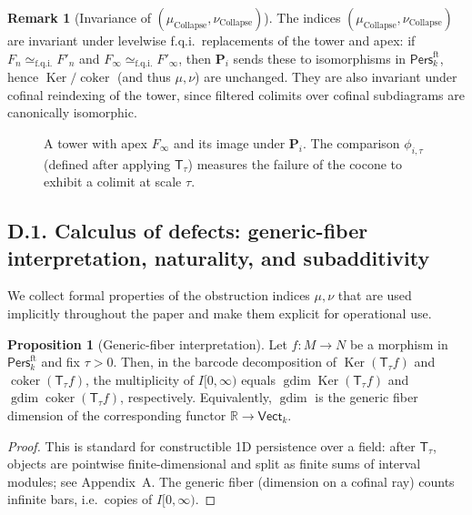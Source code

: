 \documentclass[11pt]{article}
\numberwithin{equation}{section}
\theoremstyle{plain}
\theoremstyle{definition}
\theoremstyle{remark}
\DeclareMathOperator{\Ker}{Ker}
\DeclareMathOperator{\gdim}{gdim}
\newcommand{\RR}{\mathbb{R}}
\newcommand{\Pers}{\mathsf{Pers}}
\newcommand{\Vect}{\mathsf{Vect}}
\newcommand{\T}{\mathsf{T}}
\theoremstyle{plain}
\theoremstyle{definition}
\numberwithin{equation}{section}
\newtheorem{proposition}[theorem]{Proposition}
\theoremstyle{definition}
\newtheorem{remark}[theorem]{Remark}
\DeclareRobustCommand{\muc}{\mu_{\mathrm{Collapse}}}
\DeclareRobustCommand{\nuc}{\nu_{\mathrm{Collapse}}}
\numberwithin{equation}{section}
\theoremstyle{plain}
\theoremstyle{definition}
\theoremstyle{remark}
\newcommand{\Pfun}{\mathbf{P}}
\DeclareMathOperator{\coker}{coker} %
\providecommand{\muc}{\mu_{\mathrm{Collapse}}}
\providecommand{\nuc}{\nu_{\mathrm{Collapse}}}
\providecommand{\n}{\unskip\space}
\begin{document}
\begin{remark}[Invariance of \((\muc,\nuc)\)]
The indices \((\muc,\nuc)\) are invariant under levelwise f.q.i.\ replacements of the tower and apex: if \(F_n\simeq_{\mathrm{f.q.i.}}F'_n\) and \(F_\infty\simeq_{\mathrm{f.q.i.}}F'_\infty\), then \(\Pfun_i\) sends these to isomorphisms in \(\Pers^{\mathrm{ft}}_k\), hence \(\Ker/\coker\) (and thus \(\mu,\nu\)) are unchanged.
They are also invariant under cofinal reindexing of the tower, since filtered colimits over cofinal subdiagrams are canonically isomorphic.
\end{remark}

\begin{figure}[t]
\centering
{}
\caption{A tower with apex \(F_\infty\) and its image under \(\Pfun_i\).
The comparison \(\phi_{i,\tau}\) (defined after applying \(\T_\tau\)) measures the failure of the cocone to exhibit a colimit at scale \(\tau\).}
\end{figure}

\subsection*{D.1. Calculus of defects: generic-fiber interpretation, naturality, and subadditivity}

We collect formal properties of the obstruction indices \(\mu,\nu\) that are used implicitly throughout the paper and make them explicit for operational use.

\begin{proposition}[Generic-fiber interpretation]\label{prop:D-gdim-iff}
Let \(f:M\to N\) be a morphism in \(\Pers^{\mathrm{ft}}_k\) and fix \(\tau>0\).
Then, in the barcode decomposition of \(\Ker(\T_\tau f)\) and \(\coker(\T_\tau f)\), the multiplicity of \(I[0,\infty)\) equals \(\gdim\Ker(\T_\tau f)\) and \(\gdim\coker(\T_\tau f)\), respectively.
Equivalently, \(\gdim\) is the generic fiber dimension of the corresponding functor \(\RR\to\Vect_k\).
\end{proposition}

\begin{proof}
This is standard for constructible 1D persistence over a field: after \(\T_\tau\), objects are pointwise finite-dimensional and split as finite sums of interval modules; see Appendix~A.
The generic fiber (dimension on a cofinal ray) counts infinite bars, i.e.\ copies of \(I[0,\infty)\).
\end{proof}
\end{document}
